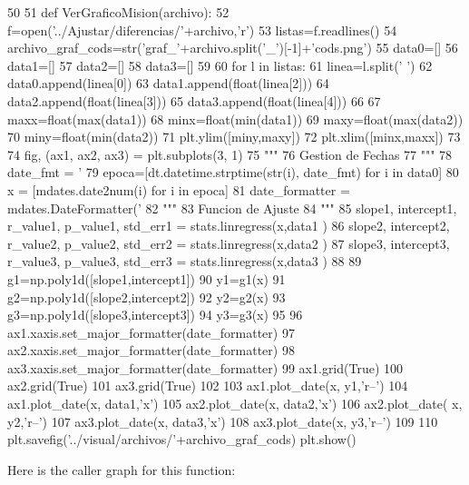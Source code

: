 \begin{DoxyCode}
50 
51 def VerGraficoMision(archivo):
52     f=open('../Ajustar/diferencias/'+archivo,'r')
53     listas=f.readlines()
54     archivo_graf_cods=str('graf_'+archivo.split('_')[-1]+'cods.png')
55     data0=[]
56     data1=[]
57     data2=[]
58     data3=[]
59     
60     for l in listas:
61         linea=l.split(' ')
62         data0.append(linea[0])
63         data1.append(float(linea[2]))
64         data2.append(float(linea[3]))
65         data3.append(float(linea[4]))
66                      
67     maxx=float(max(data1))
68     minx=float(min(data1))
69     maxy=float(max(data2))
70     miny=float(min(data2))
71     plt.ylim([miny,maxy])
72     plt.xlim([minx,maxx])
73     
74     fig, (ax1, ax2, ax3) = plt.subplots(3, 1)
75     """
76     Gestion de Fechas
77     """
78     date_fmt = '%
79     epoca=[dt.datetime.strptime(str(i), date_fmt) for i in data0]
80     x = [mdates.date2num(i) for i in epoca]
81     date_formatter = mdates.DateFormatter('%
82     """
83     Funcion de Ajuste
84     """
85     slope1, intercept1, r_value1, p_value1, std_err1 = stats.linregress(x,data1
      )
86     slope2, intercept2, r_value2, p_value2, std_err2 = stats.linregress(x,data2
      )
87     slope3, intercept3, r_value3, p_value3, std_err3 = stats.linregress(x,data3
      )
88 
89     g1=np.poly1d([slope1,intercept1])
90     y1=g1(x)
91     g2=np.poly1d([slope2,intercept2])
92     y2=g2(x)
93     g3=np.poly1d([slope3,intercept3])
94     y3=g3(x)
95 
96     ax1.xaxis.set_major_formatter(date_formatter)
97     ax2.xaxis.set_major_formatter(date_formatter)
98     ax3.xaxis.set_major_formatter(date_formatter)
99     ax1.grid(True)
100     ax2.grid(True)
101     ax3.grid(True)
102     
103     ax1.plot_date(x, y1,'r--')
104     ax1.plot_date(x, data1,'x')
105     ax2.plot_date(x, data2,'x')
106     ax2.plot_date( x, y2,'r--')
107     ax3.plot_date(x, data3,'x')
108     ax3.plot_date(x, y3,'r--')
109 
110     plt.savefig('../visual/archivos/'+archivo_graf_cods)
    plt.show()\end{DoxyCode}


\-Here is the caller graph for this function\-:



